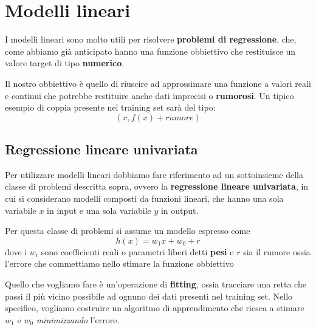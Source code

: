 \chapter{Modelli lineari}
I modelli lineari sono molto utili per risolvere \textbf{problemi di regressione}, che, come abbiamo gi\`a anticipato
hanno una funzione obbiettivo che restituisce un valore target di tipo \textbf{numerico}.

Il nostro obbiettivo \`e quello di riuscire ad approssimare una funzione a valori reali e continui che potrebbe restituire
anche dati imprecisi o \textbf{rumorosi}. Un tipico esempio di coppia presente nel training set sar\`a del tipo:
\[ (x, f(x) + rumore) \]

\section{Regressione lineare univariata}
Per utilizzare modelli lineari dobbiamo fare riferimento ad un sottoinsieme della classe di problemi descritta sopra, ovvero
la \textbf{regressione lineare univariata}, in cui si considerano modelli composti da funzioni lineari, che hanno una sola
variabile $x$ in input e una sola variabile $y$ in output.

Per questa classe di problemi si assume un modello espresso come
\[ h(x) = w_1 x + w_0 + r \]
dove i $w_i$ sono coefficienti reali o parametri liberi detti \textbf{pesi} e $r$ sia il rumore ossia l'errore che
commettiamo nello stimare la funzione obbiettivo

Quello che vogliamo fare \`e un'operazione di \textbf{fitting}, ossia tracciare una retta che passi il pi\`u vicino
possibile ad ognuno dei dati presenti nel training set. Nello specifico, vogliamo costruire un algoritmo di apprendimento
che riesca a stimare $w_1$ e $w_0$ \emph{minimizzando} l'errore.